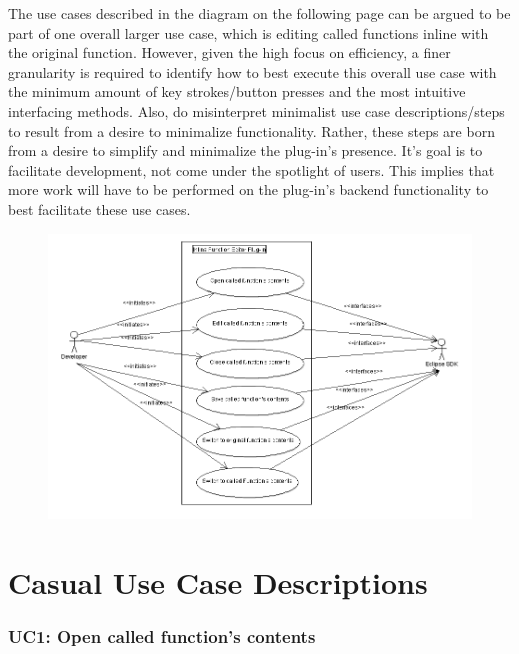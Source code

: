 \documentclass[]{report}
\begin{document}
		The use cases described in the diagram on the following page can be argued to be part of one overall larger use case, which is editing called functions inline with the original function.  However, given the high focus on efficiency, a finer granularity is required to identify how to best execute this overall use case with the minimum amount of key strokes/button presses and the most intuitive interfacing methods.  Also, do misinterpret minimalist use case descriptions/steps to result from a desire to minimalize functionality.  Rather, these steps are born from a desire to simplify and minimalize the plug-in's presence.  It's goal is to facilitate development, not come under the spotlight of users.  This implies that more work will have to be performed on the plug-in's backend functionality to best facilitate these use cases.
	
		\begin{figure}[h!]
			\centering
			\includegraphics[width=\linewidth]{imgs/use_case_diagram.png}
		\end{figure}
	
	\newpage
	
	\section{Casual Use Case Descriptions}
	
		\subsubsection{UC1:  Open called function's contents}
		
\end{document}
